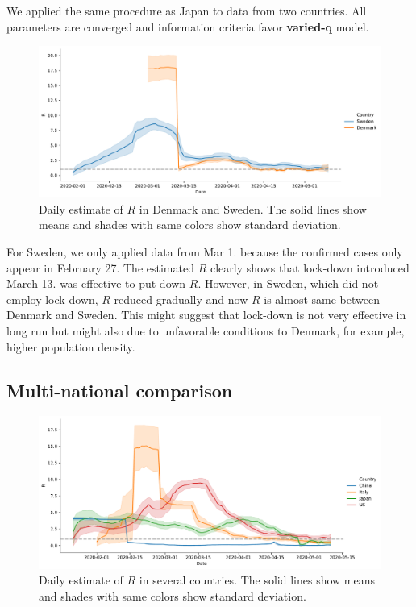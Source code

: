 \documentclass{amsart}
\begin{document}
We applied the same procedure as Japan to data from two countries.
All parameters are converged and information criteria favor \textbf{varied-q} model.
\begin{figure}[h]
 \centering
 \includegraphics[width=\linewidth]{fig/R_Nordic.pdf}
 \caption{Daily estimate of $R$ in Denmark and Sweden. The solid lines show means and shades with same colors show standard deviation.}
 \label{fig:nordic}
\end{figure}
For Sweden, we only applied data from Mar 1. because the confirmed cases only appear in February 27.
The estimated $R$ clearly shows that lock-down introduced March 13. was effective to put down $R$.
However, in Sweden, which did not employ lock-down, $R$ reduced gradually and now $R$ is almost same between Denmark and Sweden.
This might suggest that lock-down is not very effective in long run but might also due to unfavorable conditions to Denmark, for example, higher population density.

\subsection{Multi-national comparison}

\begin{figure}[h]
 \centering
 \includegraphics[width=\linewidth]{fig/R_multi.pdf}
 \caption{Daily estimate of $R$ in several countries. The solid lines show means and shades with same colors show standard deviation.}
 \label{fig:multi-countries}
\end{figure}
\end{document}
